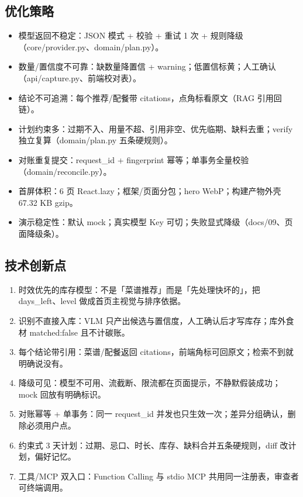 \subsection{优化策略}

\begin{itemize}
\item 模型返回不稳定：JSON 模式 + 校验 + 重试 1 次 + 规则降级（core/provider.py、domain/plan.py）。
\item 数量/置信度不可靠：缺数量降置信 + warning；低置信标黄；人工确认（api/capture.py、前端校对表）。
\item 结论不可追溯：每个推荐/配餐带 citations，点角标看原文（RAG 引用回链）。
\item 计划约束多：过期不入、用量不超、引用非空、优先临期、缺料去重；verify 独立复算（domain/plan.py 五条硬规则）。
\item 对账重复提交：request\_id + fingerprint 幂等；单事务全量校验（domain/reconcile.py）。
\item 首屏体积：6 页 React.lazy；框架/页面分包；hero WebP；构建产物外壳 67.32 KB gzip。
\item 演示稳定性：默认 mock；真实模型 Key 可切；失败显式降级（docs/09、页面降级条）。
\end{itemize}

\subsection{技术创新点}

\begin{enumerate}
\item 时效优先的库存模型：不是「菜谱推荐」而是「先处理快坏的」，把 days\_left、level 做成首页主视觉与排序依据。
\item 识别不直接入库：VLM 只产出候选与置信度，人工确认后才写库存；库外食材 matched:false 且不计碳账。
\item 每个结论带引用：菜谱/配餐返回 citations，前端角标可回原文；检索不到就明确说没有。
\item 降级可见：模型不可用、流截断、限流都在页面提示，不静默假装成功；mock 回放有明确标识。
\item 对账幂等 + 单事务：同一 request\_id 并发也只生效一次；差异分组确认，删除必须用户点。
\item 约束式 3 天计划：过期、忌口、时长、库存、缺料合并五条硬规则，diff 改计划，偏好记忆。
\item 工具/MCP 双入口：Function Calling 与 stdio MCP 共用同一注册表，审查者可终端调用。
\end{enumerate}

